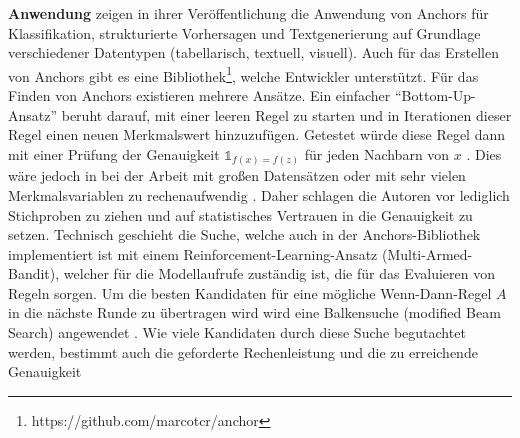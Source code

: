 \textbf{Anwendung}
\textcite{ribeiro2018anchors} zeigen in ihrer Veröffentlichung die Anwendung von Anchors für Klassifikation, strukturierte Vorhersagen und Textgenerierung auf Grundlage verschiedener Datentypen (tabellarisch, textuell, visuell). Auch für das Erstellen von Anchors gibt es eine Bibliothek\footnote{https://github.com/marcotcr/anchor}, welche Entwickler unterstützt.
Für das Finden von Anchors existieren mehrere Ansätze. Ein einfacher \enquote{Bottom-Up-Ansatz} beruht darauf, mit einer leeren Regel zu starten und in Iterationen dieser Regel einen neuen Merkmalswert hinzuzufügen. Getestet würde diese Regel dann mit einer Prüfung der Genauigkeit $\mathbb{1}_{f(x)=f(z)}$  für jeden Nachbarn von $x$ \cite{ribeiro2018anchors}. Dies wäre jedoch in bei der Arbeit mit großen Datensätzen oder mit sehr vielen Merkmalsvariablen zu rechenaufwendig \cite{molnar2022}.
Daher schlagen die Autoren vor lediglich Stichproben zu ziehen und auf statistisches Vertrauen in die Genauigkeit zu setzen. Technisch geschieht die Suche, welche auch in der Anchors-Bibliothek implementiert ist mit einem Reinforcement-Learning-Ansatz (Multi-Armed-Bandit), welcher für die Modellaufrufe zuständig ist, die für das Evaluieren von Regeln sorgen. Um die besten Kandidaten für eine mögliche Wenn-Dann-Regel $A$ in die nächste Runde zu übertragen wird wird eine Balkensuche (modified Beam Search) angewendet \cite{ribeiro2018anchors}. Wie viele Kandidaten durch diese Suche begutachtet werden, bestimmt auch die geforderte Rechenleistung und die zu erreichende Genauigkeit \cite{molnar2022}

